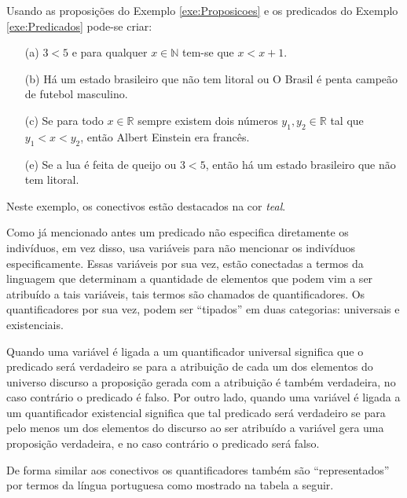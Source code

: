 \begin{exemplo}\label{exe:Conectivos}
	Usando as proposições do Exemplo \ref{exe:Proposicoes} e os predicados do Exemplo \ref{exe:Predicados} pode-se criar:
	\begin{itemize}
		\item[(a)] $3 < 5$ {\color{teal}e} para qualquer $x \in\mathbb{N}$ tem-se que $x < x + 1$.
		\item[(b)] Há um estado brasileiro que não tem litoral {\color{teal}ou} O Brasil é penta campeão de futebol masculino.
		\item[(c)] {\color{teal}Se} para todo $x \in \mathbb{R}$ sempre existem dois números $y_1, y_2 \in \mathbb{R}$ tal que $y_1 < x < y_2$, {\color{teal}então} Albert Einstein era francês.
		\item[(e)] {\color{teal}Se} a lua é feita de queijo {\color{teal}ou} $3 < 5$, {\color{teal}então} há um estado brasileiro que não tem litoral.
	\end{itemize}
	Neste exemplo, os conectivos estão destacados na cor \textit{{\color{teal} teal}}.
\end{exemplo}

Como já mencionado antes um predicado não especifica diretamente os indivíduos, em vez disso, usa variáveis para não mencionar os indivíduos especificamente. Essas variáveis por sua vez, estão conectadas a termos da linguagem que determinam a quantidade de elementos que podem vim a ser atribuído a tais variáveis, tais termos são chamados de quantificadores. Os quantificadores por sua vez, podem ser ``tipados'' em duas categorias: universais e existenciais.

Quando uma variável é ligada a um quantificador universal significa que o predicado será verdadeiro se para a atribuição de cada um dos elementos do universo discurso a proposição gerada com a atribuição é também verdadeira, no caso contrário o predicado é falso. Por outro lado, quando uma variável é ligada a um quantificador existencial significa que tal predicado será verdadeiro se para pelo menos um dos elementos do discurso ao ser atribuído a variável gera uma proposição verdadeira, e no caso contrário o predicado será falso.

De forma similar aos conectivos os quantificadores também são ``representados'' por termos da língua portuguesa como mostrado na tabela a seguir.

